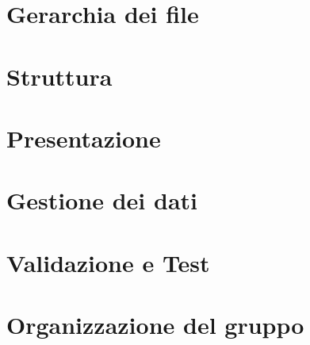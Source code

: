 \documentclass{tecweb}
\begin{document}
	\section{Gerarchia dei file}

	\section{Struttura}

	\section{Presentazione}
	
	\section{Gestione dei dati}

	\section{Validazione e Test}
	
	\appendix
	\section{Organizzazione del gruppo}
	
\end{document}
